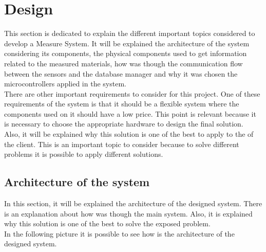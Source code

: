 
\chapter{Design}
\newpage

This section is dedicated to explain the different important topics considered to develop a Measure System. It will be explained the architecture of the system considering its components, the physical components used to get information related to the measured materials, how was though the communication flow between the sensors and the database manager and why it was chosen the microcontrollers applied in the system.\\

There are other important requirements to consider for this project. One of these requirements of the system is that it should be a flexible system where the components used on it should have a low price. This point is relevant because it is necessary to choose the appropriate hardware to design the final solution.\\

Also, it will be explained why this solution is one of the best to apply to the of the client. This is an important topic to consider because to solve different problems it is possible to apply different solutions.

\section{Architecture of the system}

In this section, it will be explained the architecture of the designed system. There is an explanation about how was though the main system. Also, it is explained why this solution is one of the best to solve the exposed problem.\\

In the following picture it is possible to see how is the architecture of the designed system.\\

